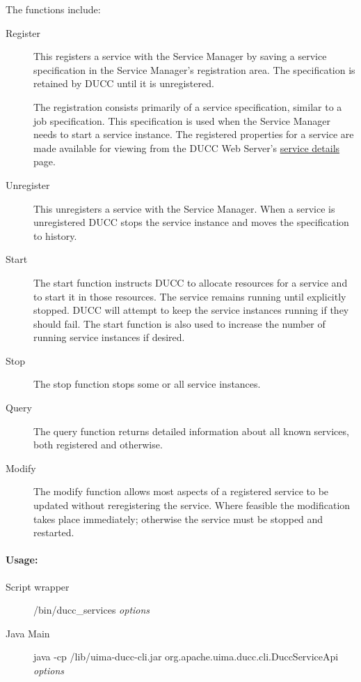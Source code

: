         The functions include: 
        \begin{description}
            \item[Register] This registers a service with the Service Manager by saving a service
              specification in the Service Manager's registration area. The specification is
              retained by DUCC until it is unregistered.

              The registration consists primarily of a service specification, similar
              to a job specification. This specification is
              used when the Service Manager needs to start a service instance.  
              The registered properties for a service are made available for
              viewing from the DUCC Web Server's \hyperref[sec:ws-service-details]{service details}
              page.
              
            \item[Unregister] This unregisters a service with the Service Manager. When a service is
              unregistered DUCC stops the service instance and moves the specification to history.
              
            \item[Start] The start function instructs DUCC to allocate resources for a service and to
              start it in those resources. The service remains running until explicitly stopped. DUCC
              will attempt to keep the service instances running if they should fail. The start function
              is also used to increase the number of running service instances if desired.
              
            \item[Stop] The stop function stops some or all service instances.
              
            \item[Query] The query function returns detailed information about all known services, both
              registered and otherwise.
              
            \item[Modify] The modify function allows most aspects of a registered service to be updated
              without reregistering the service.  Where feasible the modification takes place
              immediately; otherwise the service must be stopped and restarted.
        \end{description}
            

    \paragraph{Usage:}
       \begin{description}
          \item[Script wrapper] \ducchome/bin/ducc\_services {\em options}
          \item[Java Main]      java -cp \ducchome/lib/uima-ducc-cli.jar org.apache.uima.ducc.cli.DuccServiceApi {\em options}
          \end{description}
          
